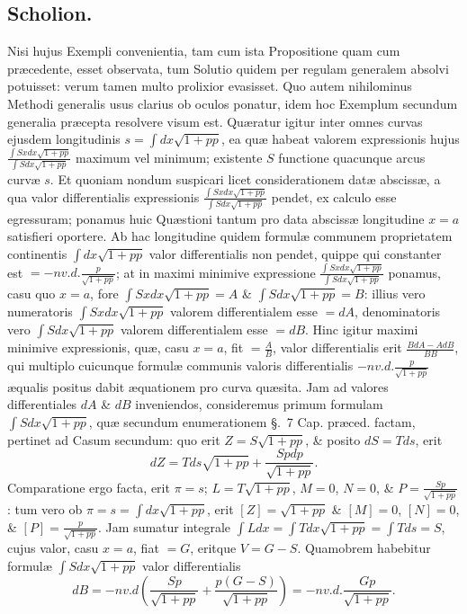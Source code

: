 \subsection*{Scholion.}
Nisi hujus Exempli convenientia, tam cum ista Propositione quam cum præcedente, esset observata, tum Solutio quidem per regulam generalem absolvi potuisset: verum tamen multo prolixior evasisset. Quo autem nihilominus Methodi generalis usus clarius ob oculos ponatur, idem hoc Exemplum secundum generalia præcepta resolvere visum est. Quæratur igitur inter omnes curvas ejusdem longitudinis $s=\int dx\sqrt{1+pp}$, ea quæ habeat valorem expressionis hujus $\frac{\int Sxdx\sqrt{1+pp}}{\int Sdx\sqrt{1+pp}}$ maximum vel minimum; existente $S$ functione quacunque arcus curvæ $s$. Et quoniam nondum suspicari licet considerationem datæ abscissæ, a qua valor differentialis expressionis $\frac{\int Sxdx\sqrt{1+pp}}{\int Sdx\sqrt{1+pp}}$ pendet, ex calculo esse egressuram; ponamus huic Quæstioni tantum pro data abscissæ longitudine $x=a$ satisfieri oportere. Ab hac longitudine quidem formulæ communem proprietatem continentis $\int dx\sqrt{1+pp}$ valor differentialis non pendet,
quippe qui constanter est $=-nv.d.\frac p{\sqrt{1+pp}}$; at in maximi minimive expressione $\frac{\int Sxdx\sqrt{1+pp}}{\int Sdx\sqrt{1+pp}}$ ponamus, casu quo $x=a$, fore $\int Sxdx\sqrt{1+pp}=A$ \& $\int Sdx\sqrt{1+pp}=B$: illius vero numeratoris $\int Sxdx\sqrt{1+pp}$ valorem differentialem esse $=dA$, denominatoris vero $\int Sdx\sqrt{1+pp}$ valorem differentialem esse $=dB$. Hinc igitur maximi minimive expressionis, quæ, casu $x=a$, fit $=\frac AB$, valor differentialis erit $\frac{BdA-AdB}{BB}$, qui multiplo cuicunque formulæ communis valoris differentialis $-nv.d.\frac p{\sqrt{1+pp}}$ æqualis positus dabit æquationem pro curva quæsita. Jam ad valores differentiales $dA$ \& $dB$ inveniendos, consideremus primum formulam $\int Sdx\sqrt{1+pp}$, quæ secundum enumerationem §.~7 Cap. præced. factam, pertinet ad Casum secundum: quo erit $Z=S\sqrt{1+pp}$, \& posito $dS=Tds$, erit
\[dZ=Tds\sqrt{1+pp}+\frac{Spdp}{\sqrt{1+pp}}.\]
Comparatione ergo facta, erit $\pi=s$; $L=T\sqrt{1+pp}$, $M=0$, $N=0$, \& $P=\frac{Sp}{\sqrt{1+pp}}$: tum vero ob $\pi=s=\int dx\sqrt{1+pp}$, erit $[Z]=\sqrt{1+pp}$ \& $[M]=0$, $[N]=0$, \& $[P]=\frac p{\sqrt{1+pp}}$. Jam sumatur integrale $\int Ldx=\int Tdx\sqrt{1+pp}=\int Tds=S$, cujus valor, casu $x=a$, fiat $=G$, eritque $V=G-S$. Quamobrem habebitur formulæ $\int Sdx\sqrt{1+pp}$ valor differentialis
\[dB=-nv.d\left(\frac{Sp}{\sqrt{1+pp}}+\frac{p(G-S)}{\sqrt{1+pp}}\right)=-nv.d.\frac{Gp}{\sqrt{1+pp}}.\]
